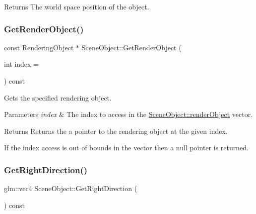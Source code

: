 \begin{DoxyReturn}{Returns}
The world space position of the object.
\end{DoxyReturn}
\hypertarget{class_scene_object_a0cfa0bb4dbb0f56900ce431cb5dbdda9}{}\label{class_scene_object_a0cfa0bb4dbb0f56900ce431cb5dbdda9}
\subsubsection{\texorpdfstring{Get\+Render\+Object()}{GetRenderObject()}}
{\footnotesize\ttfamily const \hyperlink{class_rendering_object}{Rendering\+Object} $\ast$ Scene\+Object\+::\+Get\+Render\+Object (\begin{DoxyParamCaption}\item[{int}]{index = {} }\end{DoxyParamCaption}) const\hspace{0.3cm}{\ttfamily [virtual]}}



Gets the specified rendering object.


\begin{DoxyParams}{Parameters}
{\em index} & The index to access in the \hyperlink{class_scene_object_a4bbf98a19bd8e7ddd491fbb9a41b42cf}{Scene\+Object\+::render\+Object} vector. \\
\hline
\end{DoxyParams}
\begin{DoxyReturn}{Returns}
Returns the a pointer to the rendering object at the given index.
\end{DoxyReturn}
If the index access is out of bounds in the vector then a null pointer is returned. \hypertarget{class_scene_object_a32985db85bba159afde18da0a16b3934}{}\label{class_scene_object_a32985db85bba159afde18da0a16b3934}
\subsubsection{\texorpdfstring{Get\+Right\+Direction()}{GetRightDirection()}}
{\footnotesize\ttfamily glm\+::vec4 Scene\+Object\+::\+Get\+Right\+Direction (\begin{DoxyParamCaption}{ }\end{DoxyParamCaption}) const\hspace{0.3cm}{\ttfamily [virtual]}}



